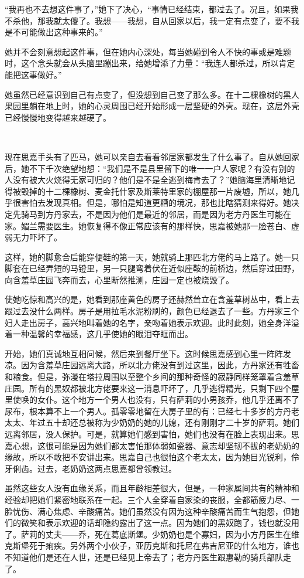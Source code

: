 \par “我再也不去想这件事了，”她下了决心，“事情已经结束，都过去了。况且，如果我不杀他，那我就太傻了。我想——我想，自从回家以后，我一定有点变了，要不我是不可能做出这种事来的。”
\par 她并不会刻意想起这件事，但在她内心深处，每当她碰到令人不快的事或是难题时，这个念头就会从头脑里蹦出来，给她增添了力量：“我连人都杀过，所以肯定能把这事做好。”
\par 她虽然已经意识到自己有点变了，但没想到自己变了那么多。在十二棵橡树的黑人果园里躺在地上时，她的心灵周围已经开始形成一层坚硬的外壳。现在，这层外壳已经慢慢地变得越来越硬了。
\par  
\par 现在思嘉手头有了匹马，她可以亲自去看看邻居家都发生了什么事了。自从她回家后，她不下千次绝望地想：“我们是不是县里留下的唯一一户人家呢？有没有别的人没有被大火烧得无家可归的？他们是不是全逃到梅肯去了？”她脑海里清晰地记得被毁掉的十二棵橡树、麦金托什家及斯莱特里家的棚屋那一片废墟，所以，她几乎很害怕去发现真相。但是，哪怕是知道更糟的境况，那也比瞎猜测来得好。她决定先骑马到方丹家去，不是因为他们是最近的邻居，而是因为老方丹医生可能在家。媚兰需要医生。她恢复得不像正常应该有的那样快，思嘉被她那一脸苍白、虚弱无力吓坏了。
\par 这样，她的脚愈合后能穿便鞋的第一天，她就骑上那匹北方佬的马上路了。她一只脚套在已经弄短的马镫里，另一只腿弯着伏在近似座鞍的前桥边，然后穿过田野，向含羞草庄园飞奔而去，心里断然推测，庄园一定也被烧毁了。
\par 使她吃惊和高兴的是，她看到那座黄色的房子还赫然耸立在含羞草树丛中，看上去跟过去没什么两样。房子是用拉毛水泥粉刷的，颜色已经退去了一些。方丹家三个妇人走出房子，高兴地叫着她的名字，亲吻着她表示欢迎。此时此刻，她全身洋溢着一种温馨的幸福感，这几乎使她的眼泪夺眶而出。
\par 开始，她们真诚地互相问候，然后来到餐厅坐下。这时候思嘉感到心里一阵阵发凉。因为含羞草庄园远离大路，所以北方佬没有到过这里，因此，方丹家还有牲畜和粮食。但是，弥漫在塔拉周围以至整个乡间的那种奇怪的寂静同样笼罩着含羞草庄园。所有的黑奴都被北方佬要来这一消息吓坏了，几乎逃得精光，只剩下四个屋里使唤的女仆。这个地方一个男人也没有，只有萨莉的小男孩乔，他几乎还离不了尿布，根本算不上一个男人。孤零零地留在大房子里的有：已经七十多岁的方丹老太太、年过五十却还总被称为少奶奶的她的儿媳，还有刚刚才二十岁的萨莉。她们远离邻居，没人保护。可是，就算她们感到害怕，她们也没有在脸上表现出来。思嘉心想，这很可能是因为她们都太害怕那体弱如瓷器、意志却坚韧不拔的老奶奶的缘故，所以不敢把不安讲出来。思嘉自己也很怕这个老太太，因为她目光锐利，伶牙俐齿。过去，老奶奶这两点思嘉都曾领教过。
\par 虽然这些女人没有血缘关系，而且年龄相差很大，但是，一种家属间共有的精神和经验却把她们紧密地联系在一起。三个人全穿着自家染的丧服，全都筋疲力尽、一脸忧伤、满心焦虑、辛酸痛苦。她们虽然没有因为这种辛酸痛苦而生气抱怨，但她们的微笑和表示欢迎的话却隐约露出了这一点。因为她们的黑奴跑了，钱也就没用了。萨莉的丈夫——乔，死在葛底斯堡。少奶奶也是个寡妇，因为小方丹医生在维克斯堡死于痢疾。另外两个小伙子，亚历克斯和托尼在弗吉尼亚的什么地方，谁也不知道他们是还在人世，还是已经见上帝去了；老方丹医生跟惠勒的骑兵部队走了。
